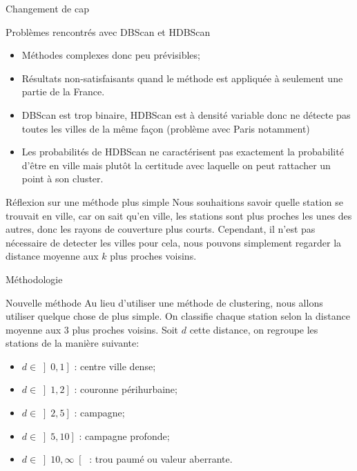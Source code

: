 \begin{frame}{Changement de cap} 
    \begin{block}{Problèmes rencontrés avec DBScan et HDBScan}
        \begin{itemize}
            \item Méthodes complexes donc peu prévisibles;
            \item Résultats non-satisfaisants quand le méthode est appliquée à seulement une partie de la France.
            \item DBScan est trop binaire, HDBScan est à densité variable donc ne détecte pas toutes les villes de la même façon (problème avec Paris notamment)
            \item Les probabilités de HDBScan ne caractérisent pas exactement la probabilité d'être en ville mais plutôt la certitude avec laquelle on peut rattacher un point à son cluster.
        \end{itemize}
    \end{block}

    \begin{block}{Réflexion sur une méthode plus simple}
        Nous souhaitions savoir quelle station se trouvait en ville, car on sait qu'en ville, les stations sont plus proches les unes des autres, donc les rayons de couverture plus courts.
        Cependant, il n'est pas nécessaire de detecter les villes pour cela, nous pouvons simplement regarder la distance moyenne aux $k$ plus proches voisins.
    \end{block}

\end{frame}

\begin{frame}{Méthodologie}
    \begin{block}{Nouvelle méthode}
        Au lieu d'utiliser une méthode de clustering, nous allons utiliser quelque chose de plus simple.
        On classifie chaque station selon la distance moyenne aux $3$ plus proches voisins. %
        Soit $d$ cette distance, on regroupe les stations de la manière suivante:
        \begin{itemize}
            \item $d\in\left]0, 1\right]$ : centre ville dense;
            \item $d\in\left]1, 2\right]$ : couronne périhurbaine;
            \item $d\in\left]2, 5\right]$ : campagne;
            \item $d\in\left]5, 10\right]$ : campagne profonde;
            \item $d\in\left]10, \infty\right[$ : trou paumé ou valeur aberrante.
        \end{itemize}
    \end{block}
\end{frame}

